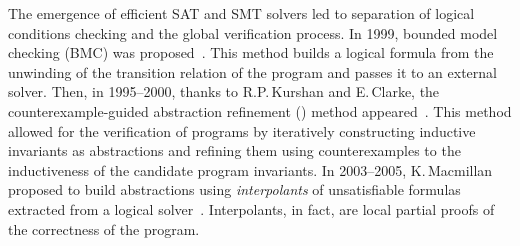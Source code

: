 The emergence of efficient SAT and SMT solvers led to separation of logical conditions checking and the global verification process. In 1999, bounded model checking (BMC) was proposed~\cite{10.1007/3-540-49059-0_14}. This method builds a logical formula from the unwinding of the transition relation of the program and passes it to an external solver. Then, in \numrange{1995}{2000}, thanks to R.P.\,Kurshan and E.\,Clarke, the counterexample-guided abstraction refinement (\cegar{}) method appeared~\cite{Kurshan1995,cegar}. This method allowed for the verification of programs by iteratively constructing inductive invariants as abstractions and refining them using counterexamples to the inductiveness of the candidate program invariants.
In \numrange{2003}{2005}, K.\,Macmillan proposed to build abstractions using \emph{interpolants} of unsatisfiable formulas extracted from a logical solver~\cite{10.1007/978-3-540-45069-6_1,10.1007/978-3-540-31980-1_1}.
Interpolants, in fact, are local partial proofs of the correctness of the program.


